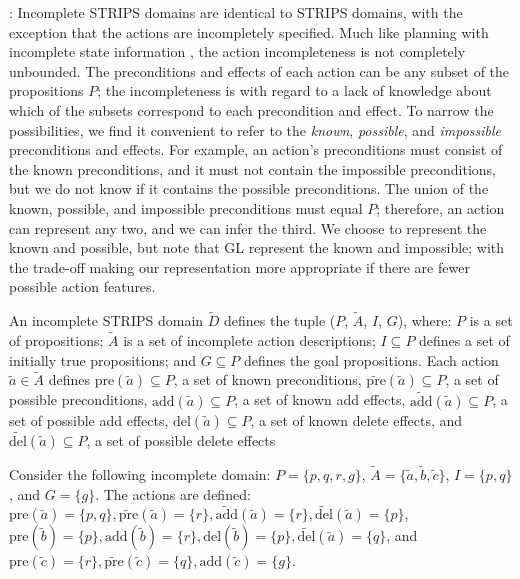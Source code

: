 \documentclass[letterpaper]{article}
\def\und#1{\noindent{\bf #1}:}
\def\citep#1{\cite{#1}}
\begin{document}
\und{Incomplete STRIPS Domains}
Incomplete STRIPS domains are identical to STRIPS domains, with the exception
that the actions are incompletely specified.  Much like planning with incomplete
state information \citep{pff,aij-mclug}, the action incompleteness is not
completely unbounded.  The preconditions and effects of each action can be any
subset of the propositions $P$; the incompleteness is with regard to a lack of
knowledge about which of the subsets correspond to each precondition and effect.
 To narrow the possibilities, we find it convenient to refer to the {\em known},
{\em possible}, and {\em impossible} preconditions and effects.  For example, an
action's preconditions must consist of the known preconditions, and it must not
contain the impossible preconditions, but we do not know if it contains the
possible preconditions.  The union of the known, possible, and impossible
preconditions must equal $P$; therefore, an action can represent any two, and we
can infer the third.  We choose to represent the known and possible, but note
that GL represent the known and impossible; with the trade-off making our
representation more appropriate if there are fewer possible action features.

An incomplete STRIPS domain $\tilde{D}$  defines the tuple ($P$, $\tilde{A}$,
$I$, $G$), where: $P$ is a  set of propositions; $\tilde{A}$ is a set of
incomplete action descriptions; $I \subseteq P$ defines a set of initially true
propositions; and $G \subseteq P$ defines the goal propositions. Each action
$\tilde{a} \in \tilde{A}$ defines $\text{pre}(\tilde{a}) \subseteq P$, a set of
known preconditions, $\widetilde{\text{pre}}(\tilde{a}) \subseteq P$, a set of
possible preconditions, $\text{add}(\tilde{a}) \subseteq P$, a set of known add
effects,  $\widetilde{\text{add}}(\tilde{a}) \subseteq P$, a set of possible add
effects, $\text{del}(\tilde{a}) \subseteq P$, a set of known delete effects, and
$\widetilde{\text{del}}(\tilde{a}) \subseteq P$, a set of possible delete
effects

Consider the following incomplete domain: $P = \{p, q, r, g\}$, $\tilde{A} =
\{\tilde{a}, \tilde{b}, \tilde{c}\}$, $I = \{p, q\}$, and $G= \{g\}$.  The
actions are defined: $\text{pre}(\tilde{a}) = \{p, q\},
\widetilde{\text{pre}}(\tilde{a})  = \{r\}, \widetilde{\text{add}}(\tilde{a}) =
\{r\},  \widetilde{\text{del}}(\tilde{a}) = \{p\}$, $
  \text{pre}(\tilde{b}) = \{p\},
 \text{add}(\tilde{b}) = \{r\},
  \text{del}(\tilde{b}) = \{p\}, \widetilde{\text{del}}(\tilde{a}) = \{q\}$, and
 $ \text{pre}(\tilde{c}) = \{r\}, \widetilde{\text{pre}}(\tilde{c})  = \{q\},
\text{add}(\tilde{c}) = \{g\}$.
\end{document}

